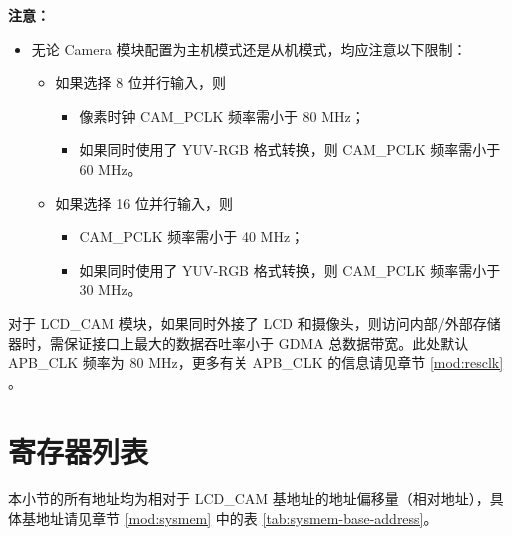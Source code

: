 \documentclass[main\_\_CN.tex]{subfiles}
\begin{document}
\textbf{注意：}
\begin{itemize}
    \item 无论 Camera 模块配置为主机模式还是从机模式，均应注意以下限制：
\begin{itemize}

    \item 如果选择 8 位并行输入，则
        \begin{itemize}
        \item 像素时钟 CAM\_PCLK 频率需小于 80 MHz；
        \item 如果同时使用了 YUV-RGB 格式转换，则 CAM\_PCLK 频率需小于 60 MHz。
    \end{itemize}
    \item 如果选择 16 位并行输入，则
        \begin{itemize}
        \item CAM\_PCLK 频率需小于 40 MHz；
        \item 如果同时使用了 YUV-RGB 格式转换，则 CAM\_PCLK 频率需小于 30 MHz。
    \end{itemize}

\end{itemize}
\end{itemize}

\begin{tiplisting}
对于 LCD\_CAM 模块，如果同时外接了 LCD 和摄像头，则访问内部/外部存储器时，需保证接口上最大的数据吞吐率小于 GDMA 总数据带宽。此处默认 APB\_CLK 频率为 80 MHz，更多有关 APB\_CLK 的信息请见章节 \ref{mod:resclk} \textit{}。
\end{tiplisting}




\newpage
\hypertarget{camlcdctrl-reg-summ}{}
\section{寄存器列表}
\label{sec:camlcdctrl-reg-summ}

本小节的所有地址均为相对于 LCD\_CAM 基地址的地址偏移量（相对地址），具体基地址请见章节 \ref{mod:sysmem} \textit{} 中的表 \ref{tab:sysmem-base-address}。
\end{document}
